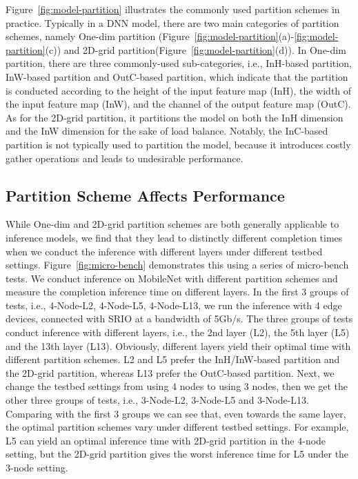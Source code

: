 
Figure~\ref{fig:model-partition} illustrates the commonly used partition schemes in practice. Typically in a DNN model, there are two main categories of partition schemes, namely One-dim partition (Figure~\ref{fig:model-partition}(a)-\ref{fig:model-partition}(c)) and 2D-grid partition(Figure~\ref{fig:model-partition}(d)). In One-dim partition, there are three commonly-used sub-categories, i.e., InH-based partition, InW-based partition and OutC-based partition, which indicate that the partition is conducted according to the height of the input feature map (InH), the width of the input feature map (InW), and the channel of the output feature map (OutC). As for the 2D-grid partition, it partitions the model on both the InH dimension and the InW dimension for the sake of load balance. Notably, the InC-based partition is not typically used to partition the model, because it introduces costly gather operations and leads to undesirable performance. 


\subsection{Partition Scheme Affects Performance}

\label{sec:micro}
While One-dim and 2D-grid partition schemes are both generally applicable to inference models, we find that they lead to distinctly different completion times when we conduct the inference with different layers under different testbed settings. Figure~\ref{fig:micro-bench} demonstrates this using a series of micro-bench tests. We conduct inference on MobileNet with different partition schemes and measure the completion inference time on different layers. In the first 3 groups of tests, i.e., 4-Node-L2, 4-Node-L5, 4-Node-L13, we run the inference with 4 edge devices, connected with SRIO at a bandwidth of 5Gb/s. The three groups of tests conduct inference with different layers, i.e., the 2nd layer (L2), the 5th layer (L5) and the 13th layer (L13). Obviously, different layers yield their optimal time with different partition schemes. L2 and L5 prefer the InH/InW-based partition and the 2D-grid partition, whereas L13 prefer the OutC-based partition. Next, we change the testbed settings from using 4 nodes to using 3 nodes, then we get the other three groups of tests, i.e., 3-Node-L2, 3-Node-L5 and 3-Node-L13. Comparing with the first 3 groups we can see that, even towards the same layer, the optimal partition schemes vary under different testbed settings. For example, L5 can yield an optimal inference time with 2D-grid partition in the 4-node setting, but the 2D-grid partition gives the worst inference time for L5 under the 3-node setting. 


